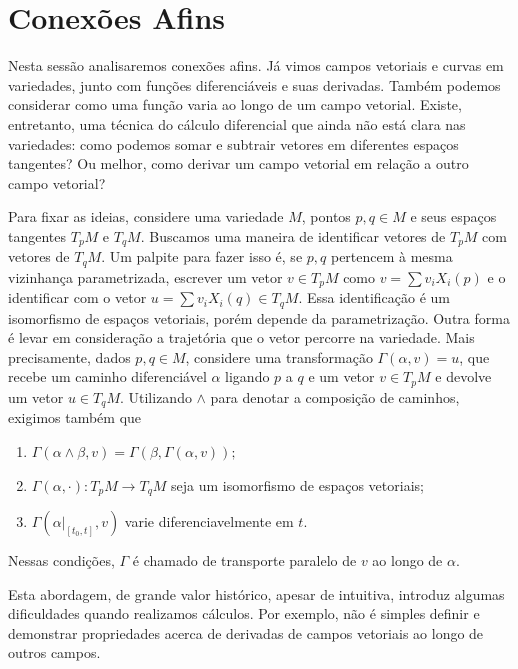 \section{Conexões Afins}
\label{sec:conexoes-afins}
Nesta sessão analisaremos conexões afins.
Já vimos campos vetoriais e curvas em variedades, junto com funções diferenciáveis e suas derivadas. Também podemos considerar como uma função varia ao longo de um campo vetorial. Existe, entretanto, uma técnica do cálculo diferencial que ainda não está clara nas variedades: como podemos somar e subtrair vetores em diferentes espaços tangentes? Ou melhor, como derivar um campo vetorial em relação a outro campo vetorial?

Para fixar as ideias, considere uma variedade $M$, pontos $p,q \in M$ e seus espaços tangentes $T_{p}M$ e $T_{q}M$. Buscamos uma maneira de identificar vetores de $T_{p}M$ com vetores de $T_{q}M$.
Um palpite para fazer isso é, se $p, q$ pertencem à mesma vizinhança parametrizada, escrever um vetor $v \in T_{p}M$ como $v=\sum v_{i}X_{i}(p)$ e o identificar com o vetor $u=\sum v_{i}X_{i}(q) \in T_{q}M$. Essa identificação é um isomorfismo de espaços vetoriais, porém depende da parametrização. Outra forma é levar em consideração a trajetória que o vetor percorre na variedade. Mais precisamente, dados $p,q \in M$, considere uma transformação $\Gamma(\alpha, v) = u$, que recebe um caminho diferenciável $\alpha$ ligando $p$ a $q$ e um vetor $v \in T_{p}M$ e devolve um vetor $u \in T_{q}M$. Utilizando $\wedge$ para denotar a composição de caminhos, exigimos também que
\begin{enumerate}[label=(\roman*)]
	\item $\Gamma(\alpha \wedge \beta, v) = \Gamma(\beta, \Gamma(\alpha, v));$
	\item $\Gamma(\alpha, \cdot):T_{p}M\to T_{q}M$ seja um isomorfismo de espaços vetoriais;
	\item $\Gamma(\alpha|_{[t_{0},t]},v)$ varie diferenciavelmente em $t$.
\end{enumerate}

Nessas condições, $\Gamma$ é chamado de transporte paralelo de $v$ ao longo de $\alpha$.

Esta abordagem, de grande valor histórico, apesar de intuitiva, introduz algumas dificuldades quando realizamos cálculos. Por exemplo, não é simples definir e demonstrar propriedades acerca de derivadas de campos vetoriais ao longo de outros campos.

